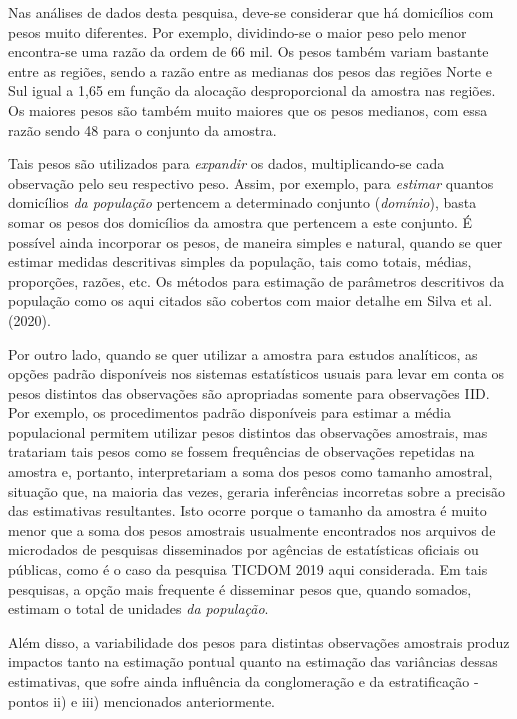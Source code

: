 \documentclass[
  12pt,
  brazilian,
]{book}
\theoremstyle{definition}
\theoremstyle{definition}
\theoremstyle{definition}
\theoremstyle{definition}
\theoremstyle{remark}
\begin{document}
Nas análises de dados desta pesquisa, deve-se considerar que há domicílios com pesos muito diferentes. Por exemplo, dividindo-se o maior peso pelo menor encontra-se uma razão da ordem de 66 mil. Os pesos também variam bastante entre as regiões, sendo a razão entre as medianas dos pesos das regiões Norte e Sul igual a 1,65 em função da alocação desproporcional da amostra nas regiões. Os maiores pesos são também muito maiores que os pesos medianos, com essa razão sendo 48 para o conjunto da amostra.

Tais pesos são utilizados para \emph{expandir} os dados, multiplicando-se cada observação pelo seu respectivo peso. Assim, por exemplo, para \emph{estimar}
quantos domicílios \emph{da população} pertencem a determinado conjunto (\emph{domínio}), basta somar os pesos dos domicílios da amostra que pertencem a este conjunto. É possível ainda incorporar os pesos, de maneira simples e natural, quando se quer estimar medidas descritivas simples da população, tais como totais, médias, proporções, razões, etc. Os métodos para estimação de parâmetros descritivos da população como os aqui citados são cobertos com maior detalhe em Silva et al. (2020).

Por outro lado, quando se quer utilizar a amostra para estudos analíticos, as
opções padrão disponíveis nos sistemas estatísticos usuais para levar em conta os pesos distintos das observações são apropriadas somente para observações IID. Por exemplo, os procedimentos padrão disponíveis para estimar a média populacional permitem utilizar pesos distintos das observações amostrais, mas tratariam tais pesos como se fossem frequências de observações repetidas na amostra e, portanto, interpretariam a soma dos pesos como tamanho amostral, situação que, na maioria das vezes, geraria inferências incorretas sobre a precisão das estimativas resultantes. Isto ocorre porque o tamanho da amostra é muito menor que a soma dos pesos amostrais usualmente encontrados nos arquivos de microdados de pesquisas disseminados por agências de estatísticas oficiais ou públicas, como é o caso da pesquisa TICDOM 2019 aqui considerada. Em tais pesquisas, a opção mais frequente é disseminar pesos que, quando somados, estimam o total de unidades \emph{da população}.

Além disso, a variabilidade dos pesos para distintas observações amostrais
produz impactos tanto na estimação pontual quanto na estimação das variâncias dessas estimativas, que sofre ainda influência da conglomeração e da estratificação - pontos ii) e iii) mencionados anteriormente.
\end{document}
